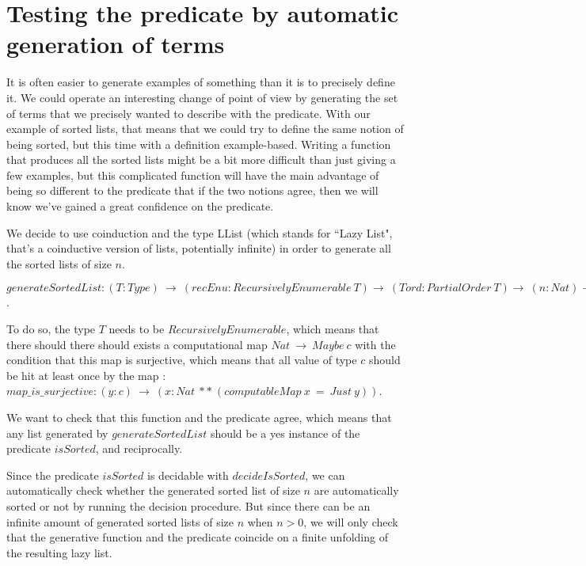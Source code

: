 \section{Testing the predicate by automatic generation of terms}

\label{sect:testingInside}


It is often easier to generate examples of something than it is to precisely define it. We could operate an interesting change of point of view by generating the set of terms that we precisely wanted to describe with the predicate. With our example of sorted lists, that means that we could try to define the same notion of being sorted, but this time with a definition example-based. Writing a function that produces all the sorted lists might be a bit more difficult than just giving a few examples, but this complicated function will have the main advantage of being so different to the predicate that if the two notions agree, then we will know we've gained a great confidence on the predicate.

We decide to use coinduction and the type LList (which stands for ``Lazy List", that's a coinductive version of lists, potentially infinite) in order to generate all the sorted lists of size $n$.

$generateSortedList : (T:Type)\ \rightarrow\ (recEnu:RecursivelyEnumerable\ T) \rightarrow\ (Tord : PartialOrder\ T) \rightarrow\ (n:Nat) \rightarrow LList (List T)$.

To do so, the type $T$ needs to be $RecursivelyEnumerable$, which means that there should there should exists a computational map $Nat\ \rightarrow\ Maybe\ c$ with the condition that this map is surjective, which means that all value of type $c$ should be hit at least once by the map : $map\_is\_surjective : (y:c)\ \rightarrow\ (x:Nat\ **\ (computableMap\ x\ =\ Just\ y))$.

We want to check that this function and the predicate agree, which means that any list generated by $generateSortedList$ should be a yes instance of the predicate $isSorted$, and reciprocally.

Since the predicate $isSorted$ is decidable with $decideIsSorted$, we can automatically check whether the generated sorted list of size $n$ are automatically sorted or not by running the decision procedure. But since there can be an infinite amount of generated sorted lists of size $n$ when $n > 0$, we will only check that the generative function and the predicate coincide on a finite unfolding of the resulting lazy list.







